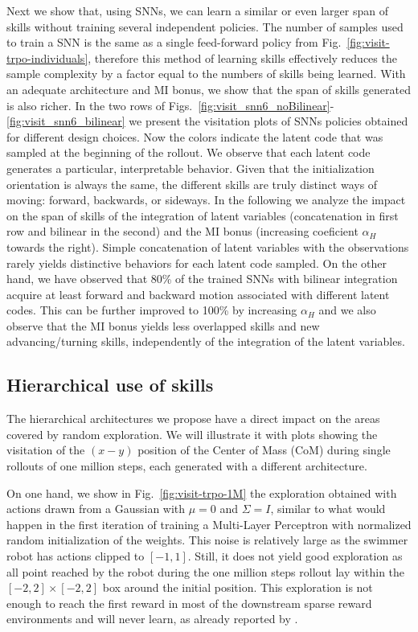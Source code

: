 \documentclass{article} %
\begin{document}
Next we show that, using SNNs, we can learn a similar or even larger span of skills without training several independent policies. The number of samples used to train a SNN is the same as a single feed-forward policy from Fig.\ \ref{fig:visit-trpo-individuals}, therefore this method of learning skills effectively reduces the sample complexity by a factor equal to the numbers of skills being learned. With an adequate architecture and MI bonus, we show that the span of skills generated is also richer.   
In the two rows of Figs.\ \ref{fig:visit_snn6_noBilinear}-\ref{fig:visit_snn6_bilinear} we present the visitation plots of SNNs policies obtained for different design choices. Now the colors indicate the latent code that was sampled at the beginning of the rollout. We observe that each latent code generates a particular, interpretable behavior. Given that the initialization orientation is always the same, the different skills are truly distinct ways of moving: forward, backwards, or sideways. In the following we analyze the impact on the span of skills of the integration of latent variables (concatenation in first row and bilinear in the second) and the MI bonus (increasing coeficient $\alpha_H$ towards the right). Simple concatenation of latent variables with the observations rarely yields distinctive behaviors for each latent code sampled. On the other hand, we have observed that 80\% of the trained SNNs with bilinear integration acquire at least forward and backward motion associated with different latent codes. This can be further improved to 100\% by increasing $\alpha_H$ and we also observe that the MI bonus yields less overlapped skills and new advancing/turning skills, independently of the integration of the latent variables.



\subsection{Hierarchical use of skills}

The hierarchical architectures we propose have a direct impact on the areas covered by random exploration. We will illustrate it with plots showing the visitation of the $(x-y)$ position of the Center of Mass (CoM) during single rollouts of one million steps, each generated with a different architecture. 

On one hand, we show in Fig.\ \ref{fig:visit-trpo-1M} the exploration obtained with actions drawn from a Gaussian with $\mu=0$ and $\Sigma=I$, similar to what would happen in the first iteration of training a Multi-Layer Perceptron with normalized random initialization of the weights. This noise is relatively large as the swimmer robot has actions clipped to $[-1,1]$. Still, it does not yield good exploration as all point reached by the robot during the one million steps rollout lay within the $[-2,2]\times[-2,2]$ box around the initial position. This exploration is not enough to reach the first reward in most of the downstream sparse reward environments and will never learn, as already reported by \citet{duan2016benchmarking}. 
\end{document}
